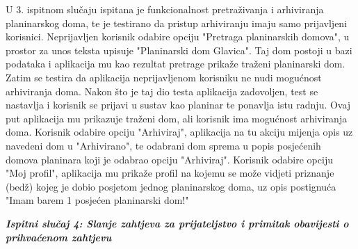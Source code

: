  		U 3. ispitnom slučaju ispitana je funkcionalnost pretraživanja i arhiviranja planinarskog doma, te je testirano da pristup arhiviranju imaju samo prijavljeni korisnici. Neprijavljen korisnik odabire opciju "Pretraga planinarskih domova", u prostor za unos teksta upisuje "Planinarski dom Glavica". Taj dom postoji u bazi podataka i aplikacija mu kao rezultat pretrage prikaže traženi planinarski dom. Zatim se testira da aplikacija neprijavljenom korisniku ne nudi mogućnost arhiviranja doma. Nakon što je taj dio testa aplikacija zadovoljen, test se nastavlja i korisnik se prijavi u sustav kao planinar te ponavlja istu radnju. Ovaj put aplikacija mu prikazuje traženi dom, ali korisnik ima mogućnost arhiviranja doma. Korisnik odabire opciju "Arhiviraj", aplikacija na tu akciju mijenja opis uz navedeni dom u "Arhivirano", te odabrani dom sprema u popis posjećenih domova planinara koji je odabrao opciju "Arhiviraj". Korisnik odabire opciju "Moj profil", aplikacija mu prikaže profil na kojemu se može vidjeti priznanje (bedž) kojeg je dobio posjetom jednog planinarskog doma, uz opis postignuća "Imam barem 1 posjećen planinarski dom!"\newline
 		
 		 	\textbf{\textit{Ispitni slučaj 4: Slanje zahtjeva za prijateljstvo i primitak obavijesti o prihvaćenom zahtjevu}}
 		
